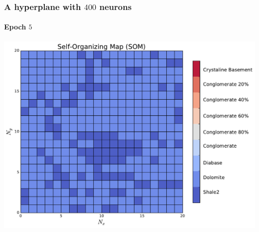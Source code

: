 \documentclass[aspectratio=10]{beamer} %
\begin{document}
%			
%			

\begin{frame}
\frametitle{A hyperplane with $400$ neurons}
\framesubtitle{Epoch $5$}
\centering
\includegraphics[scale=0.4]{Imagens/SOM5.pdf} 
\end{frame}
\end{document}
